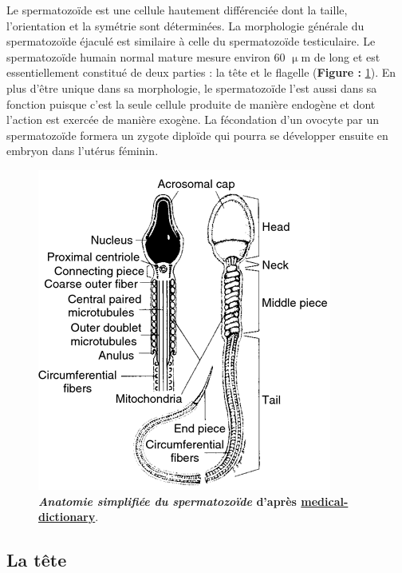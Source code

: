 \documentclass[12pt,a4paper,twoside]{ugathesis}
\theoremstyle{definition}
\theoremstyle{definition}
\theoremstyle{definition}
\theoremstyle{remark}
\begin{document}
Le spermatozoïde est une cellule hautement différenciée dont la taille,
l'orientation et la symétrie sont déterminées. La morphologie générale
du spermatozoïde éjaculé est similaire à celle du spermatozoïde
testiculaire. Le spermatozoïde humain normal mature mesure environ 60
\(\upmu\)m de long et est essentiellement constitué de deux parties : la
tête et le flagelle (\textbf{Figure : }\ref{fig:spz}). En plus d'être
unique dans sa morphologie, le spermatozoïde l'est aussi dans sa
fonction puisque c'est la seule cellule produite de manière endogène et
dont l'action est exercée de manière exogène. La fécondation d'un
ovocyte par un spermatozoïde formera un zygote diploïde qui pourra se
développer ensuite en embryon dans l'utérus féminin.




\begin{figure}

{\centering \includegraphics[scale=.75]{figure/sperm_anatomy} 

}

\caption[Anatomie simplifiée du spermatozoïde]{\textbf{\emph{Anatomie simplifiée du spermatozoïde} d'après
\href{http://medical-dictionary.thefreedictionary.com/Human+sperm}{medical-dictionary}}.}\label{fig:spz}
\end{figure}

\newpage

\subsection{La tête}\label{la-tete}
\end{document}
